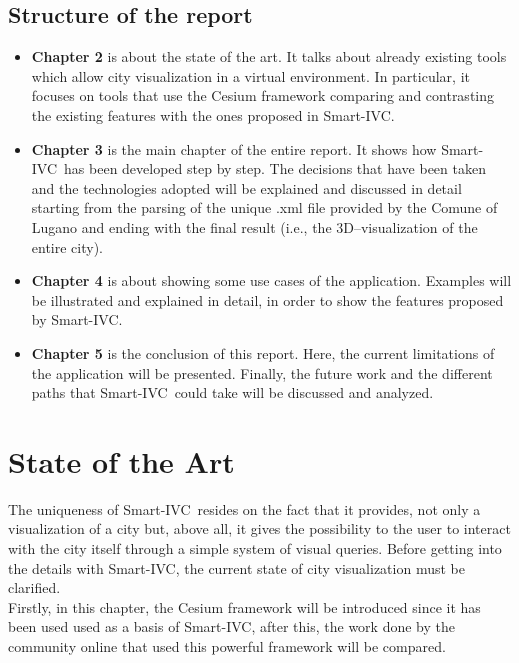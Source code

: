\documentclass[]{usiinfbachelorproject}
\newcommand{\applicationName}{Smart-IVC}
\begin{document}
\subsection{Structure of the report}
\begin{itemize}
	\item {\bf Chapter 2} is about the state of the art. It talks about already existing tools which allow city visualization in a virtual environment. In particular, it focuses on tools that use the Cesium framework comparing and contrasting the existing features with the ones proposed in \applicationName.
	\item {\bf Chapter 3} is the main chapter of the entire report. It shows how \applicationName\ has been developed step by step. The decisions that have been taken and the technologies adopted will be explained and discussed in detail starting from the parsing of the unique .xml file provided by the Comune of Lugano and ending with the final result (i.e., the 3D--visualization of the entire city). 
	\item {\bf Chapter 4} is about showing some use cases of the application. Examples will be illustrated and explained in detail, in order to show the features proposed by \applicationName. 
	\item {\bf Chapter 5} is the conclusion of this report. Here, the current limitations of the application will be presented. Finally, the future work and the different paths that \applicationName\ could take will be discussed and analyzed.
\end{itemize}

\section{State of the Art} \label{stateOfTheArt}
The uniqueness of \applicationName\ resides on the fact that it provides, not only a visualization of a city but, above all, it gives the possibility to the user to interact with the city itself through a simple system of visual queries.
Before getting into the details with \applicationName, the current state of city visualization must be clarified.\\

Firstly, in this chapter, the Cesium framework will be introduced since it has been used used as a basis of \applicationName, after this, the work done by the community online that used this powerful framework will be compared. 
\end{document}
